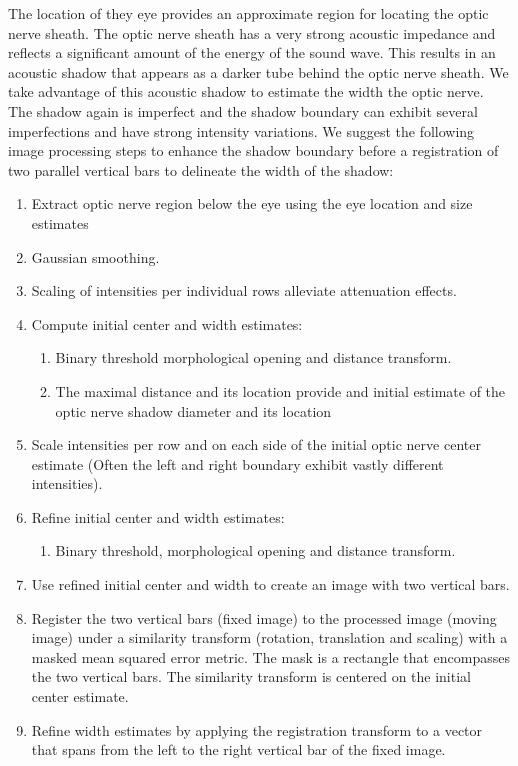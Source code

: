 \documentclass{llncs}
\begin{document}
The location of they eye provides an approximate region for locating the optic
nerve sheath. The optic nerve sheath has a very strong acoustic impedance and
reflects a significant amount of the energy of the sound wave. This results in an
acoustic shadow that appears as a darker tube behind the optic nerve sheath.
We take advantage of this acoustic shadow to estimate the width the optic nerve.
The shadow again is imperfect and the shadow boundary can exhibit several
imperfections and have strong intensity variations. We suggest the following
image processing steps to enhance the shadow boundary before a registration of
two parallel vertical bars to delineate the width of the shadow:
\begin{enumerate}
\item Extract optic nerve region below the eye using the eye location and size estimates
\item Gaussian smoothing.
\item Scaling of intensities per individual rows alleviate attenuation effects.
\item Compute initial center and width estimates:
  \begin{enumerate}
  \item Binary threshold morphological opening and distance transform.
  \item The maximal distance and its location provide and initial estimate of the
          optic nerve shadow diameter and its location
  \end{enumerate}
\item Scale intensities per row and on each side of the initial optic nerve
      center estimate (Often the left and right boundary exhibit vastly
      different intensities). 
\item Refine initial center and width estimates:
  \begin{enumerate}
  \item Binary threshold, morphological opening and distance transform.
  \end{enumerate}
\item Use refined initial center and width to create an image with two vertical bars. 
\item Register the two vertical bars (fixed image) to the processed image (moving
      image) under a similarity transform (rotation, translation and scaling)
      with a masked mean squared error metric. The mask is a rectangle that
      encompasses the two vertical bars. The similarity transform is centered on
      the initial  center estimate.
\item Refine width estimates by applying the registration transform to a vector
      that spans from the left to the right vertical bar of the fixed image.
\end{enumerate}
\end{document}
